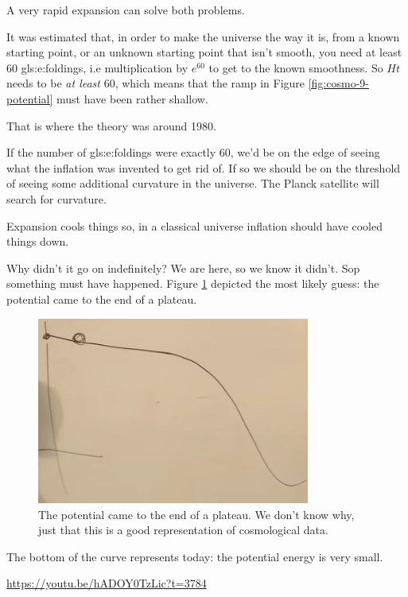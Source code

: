 \documentclass[]{article}
\begin{document}
 A very rapid expansion can solve both problems.
 
 It was estimated that, in order to make the universe the way it is, from a known starting point, or an unknown starting point that isn't smooth, you need at least 60 \glspl{gls:e:folding}, i.e multiplication by $e^{60}$ to get to the known smoothness. So $Ht$ needs to be \emph{at least} 60, which means that the ramp in Figure \ref{fig:cosmo-9-potential} must have been rather shallow.
 
 That is where the theory was around 1980.
 
 If the number of \glspl{gls:e:folding} were exactly 60, we'd be on the edge of seeing what the inflation was invented to get rid of. If so we should be on the threshold of seeing some additional curvature in the universe. The Planck satellite will search for curvature.
 
 Expansion cools things so, in a classical universe inflation should have cooled things down.
 
 Why didn't it go on indefinitely? We are here, so we know it didn't. Sop something must have happened. Figure \ref{fig:cosmo-9-something-happened} depicted the most likely guess: the potential came to the end of a plateau.
 
 \begin{figure}[H]
 	\caption[The potential came to the end of a plateau]{The potential came to the end of a plateau. We don't know why, just that this is a good representation of cosmological data.}\label{fig:cosmo-9-something-happened}
 	\includegraphics[width=0.8\textwidth]{cosmo-9-something-happened}
 \end{figure}
 
 The bottom of the curve represents today: the potential energy is very small.
 
\url{https://youtu.be/hADOY0TzLic?t=3784}
\end{document}
